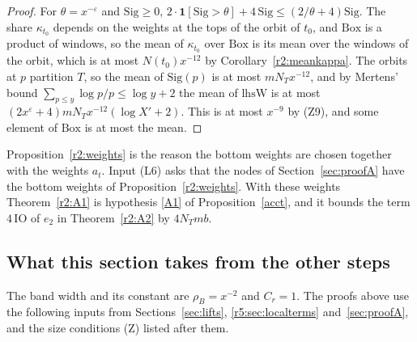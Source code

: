 \begin{proof}
For $\theta=x^{-\varepsilon}$ and $\mathrm{Sig}\ge0$, $2\cdot\mathbf 1[\mathrm{Sig}>\theta]+4\,\mathrm{Sig}\le(2/\theta+4)\mathrm{Sig}$. The share $\kappa_{t_0}$ depends on the weights at the tops of the orbit of $t_0$, and $\mathrm{Box}$ is a product of windows, so the mean of $\kappa_{t_0}$ over $\mathrm{Box}$ is its mean over the windows of the orbit, which is at most $N(t_0)x^{-12}$ by Corollary~\ref{r2:meankappa}. The orbits at $p$ partition $T$, so the mean of $\mathrm{Sig}(p)$ is at most $mN_Tx^{-12}$, and by Mertens' bound $\sum_{p\le y}\log p/p\le\log y+2$ the mean of $\mathrm{lhsW}$ is at most $(2x^\varepsilon+4)mN_Tx^{-12}(\log X'+2)$. This is at most $x^{-9}$ by (Z9), and some element of $\mathrm{Box}$ is at most the mean.
\end{proof}

Proposition~\ref{r2:weights} is the reason the bottom weights are chosen together with the weights $a_t$. Input (L6) asks that the nodes of Section~\ref{sec:proofA} have the bottom weights of Proposition~\ref{r2:weights}. With these weights Theorem~\ref{r2:A1} is hypothesis \eqref{A1} of Proposition~\ref{acct}, and it bounds the term $4\,\mathrm{IO}$ of $e_2$ in Theorem~\ref{r2:A2} by $4N_Tmb$.
\subsection{What this section takes from the other steps}\label{r2:sec:lossinputs}

The band width and its constant are $\rho_B=x^{-2}$ and $C_r=1$. The proofs above use the following inputs from Sections~\ref{sec:lifts}, \ref{r5:sec:localterms} and~\ref{sec:proofA}, and the size conditions (Z) listed after them.


